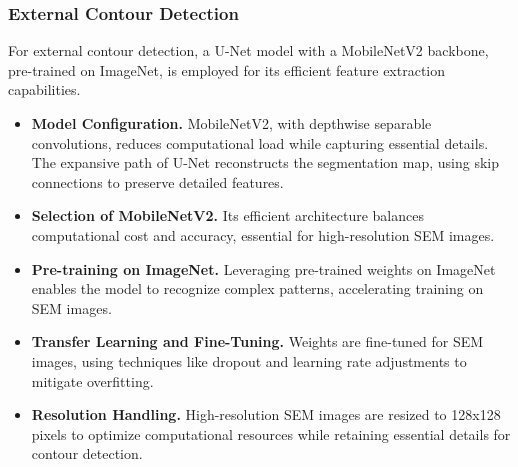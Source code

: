 \documentclass{ieeeaccess}
\begin{document}
\subsubsection{External Contour Detection}
For external contour detection, a U-Net model with a MobileNetV2 backbone, pre-trained on ImageNet, is employed for its efficient feature extraction capabilities.
\begin{itemize}
    \item \textbf{Model Configuration.} MobileNetV2, with depthwise separable convolutions, reduces computational load while capturing essential details. The expansive path of U-Net reconstructs the segmentation map, using skip connections to preserve detailed features.
    \item \textbf{Selection of MobileNetV2.} Its efficient architecture balances computational cost and accuracy, essential for high-resolution SEM images.
    \item \textbf{Pre-training on ImageNet.} Leveraging pre-trained weights on ImageNet enables the model to recognize complex patterns, accelerating training on SEM images.
    \item \textbf{Transfer Learning and Fine-Tuning.} Weights are fine-tuned for SEM images, using techniques like dropout and learning rate adjustments to mitigate overfitting.
    \item \textbf{Resolution Handling.} High-resolution SEM images are resized to 128x128 pixels to optimize computational resources while retaining essential details for contour detection.
\end{itemize}
\end{document}
